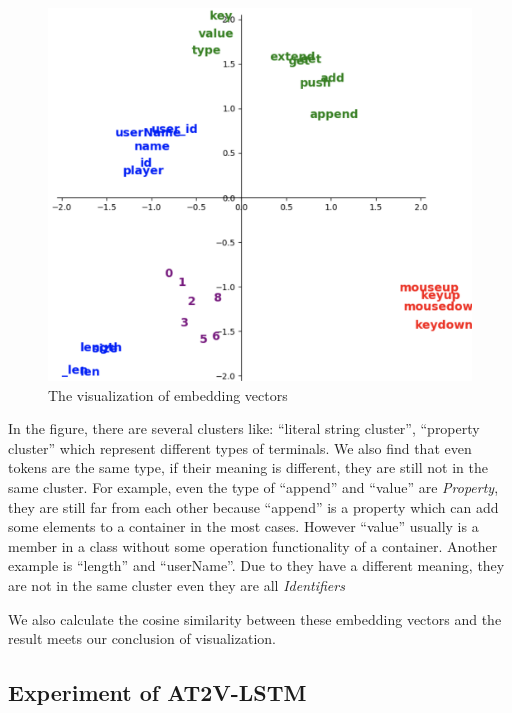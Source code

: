 \documentclass[E]{compsoft}
\begin{document}
\begin{figure}[!ht]
\centering
\includegraphics[scale=0.34]{pictures/node2vec_visualization.png}
\caption{The visualization of embedding vectors}
\label{fig:node2vec_visualization}
\end{figure}

In the figure, there are several clusters like: ``literal string cluster'', ``property cluster'' which represent different types of terminals. 
We also find that even tokens are the same type, if their meaning is different, they are still not in the same cluster. 
For example, even the type of ``append'' and ``value'' are \textit{Property}, they are still far from each other because ``append'' is a property which can add some elements to a container in the most cases.
However ``value'' usually is a member in a class without some operation functionality of a container. 
Another example is ``length'' and ``userName''.
Due to they have a different meaning, they are not in the same cluster even they are all \textit{Identifiers} 

We also calculate the cosine similarity between these embedding vectors and the result meets our conclusion of visualization. 



\subsection{Experiment of AT2V-LSTM}
\end{document}
